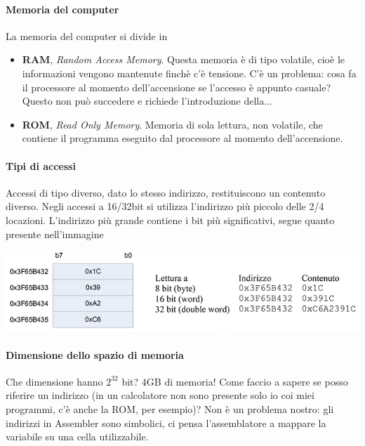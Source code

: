 \documentclass[11pt]{report}
\begin{document}
\paragraph{Memoria del computer} La memoria del computer si divide in
\begin{itemize}
\item \textbf{RAM}, \emph{Random Access Memory}. Questa memoria è di tipo volatile, cioè le informazioni vengono mantenute finchè c'è tensione. C'è un problema: cosa fa il processore al momento dell'accensione se l'accesso è appunto casuale? Questo non può succedere e richiede l'introduzione della...
\item \textbf{ROM}, \emph{Read Only Memory}. Memoria di sola lettura, non volatile, che contiene il programma eseguito dal processore al momento dell'accensione.
\end{itemize}
\paragraph{Tipi di accessi} Accessi di tipo diverso, dato lo stesso indirizzo, restituiscono un contenuto diverso. Negli accessi a 16/32bit si utilizza l'indirizzo più piccolo delle 2/4 locazioni. L'indirizzo più grande contiene i bit più significativi, segue quanto presente nell'immagine
\begin{center}
\includegraphics{img/4.PNG}
\end{center}
\paragraph{Dimensione dello spazio di memoria} Che dimensione hanno $2^{32}$ bit? $4$GB di memoria!
Come faccio a sapere se posso riferire un indirizzo (in un calcolatore non sono presente solo io coi miei programmi, c'è anche la ROM, per esempio)? Non è un problema nostro: gli indirizzi in Assembler sono simbolici, ci pensa l'assemblatore a mappare la variabile su una cella utilizzabile.
\end{document}
